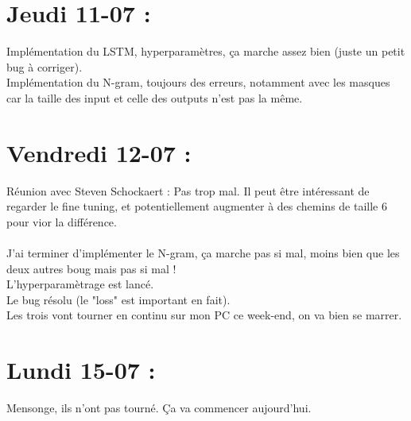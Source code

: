\documentclass{article}
\begin{document}
\section*{Jeudi 11-07 :}
Implémentation du LSTM, hyperparamètres, ça marche assez bien (juste un petit bug à corriger).\\
Implémentation du N-gram, toujours des erreurs, notamment avec les masques car la taille des input et celle des outputs n'est pas la même.
\section*{Vendredi 12-07 :}
Réunion avec Steven Schockaert :
Pas trop mal.
Il peut être intéressant de regarder le fine tuning, et potentiellement augmenter à des chemins de taille 6 pour vior la différence.\\
\\
J'ai terminer d'implémenter le N-gram, ça marche pas si mal, moins bien que les deux autres boug mais pas si mal !\\
L'hyperparamètrage est lancé.\\
Le bug résolu (le "loss" est important en fait).\\
Les trois vont tourner en continu sur mon PC ce week-end, on va bien se marrer.
\section*{Lundi 15-07 :}
Mensonge, ils n'ont pas tourné. Ça va commencer aujourd'hui.\\
\end{document}
